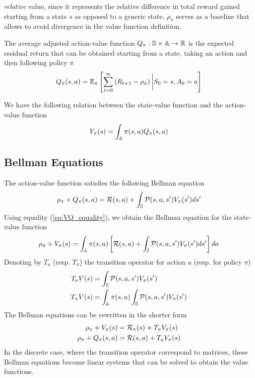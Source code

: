 \emph{relative} value, since it represents the relative difference in total
reward gained starting from a state $s$ as opposed to a generic state. 
$\rho_\pi$ serves as a baseline that allows to avoid divergence in the value
function definition.
\begin{definition}
	The average adjusted action-value function $Q_\pi : \S \times \A \to \R$ is 
	the expected residual return that can be obtained starting from a state,
	taking an action and then following policy $\pi$
	\begin{equation}
		Q_\pi(s, a) = \E[\pi]{\sum^{\infty}_{t=0} \left(R_{t+1} -
			\rho_\pi\right) \bigg| S_0 = s, A_0
		= a}
	\end{equation}
\end{definition}
We have the following relation between the state-value function and the
action-value function
\begin{equation}\label{eq:VQ_equality}
	V_\pi(s) = \int_\A \pi(s,a) Q_\pi(s,a)
\end{equation}

\subsection{Bellman Equations}
The action-value function satisfies the following Bellman equation 
\begin{equation}
	\rho_\pi + Q_\pi(s,a) = \calR(s,a) + \int_\S \calP(s,a,s') V_\pi(s') ds'
\end{equation}
Using equality (\ref{eq:VQ_equality}), we obtain the Bellman equation for the
state-value function
\begin{equation}
	\rho_\pi + V_\pi(s) = \int_\A \pi(s,a) \left[\calR(s,a) + \int_\S 
	\calP(s,a,s') V_\pi(s') ds'\right] da
\end{equation}
Denoting by $T_a$ (resp. $T_\pi$) the transition operator for action $a$ (resp. 
for policy $\pi$)
\begin{equation}
	\begin{split}
		T_a V(s) &= \int_\S \calP(s, a, s') V_\pi(s')\\
		T_\pi V(s) &= \int_\A \pi(s,a) \int_\S \calP(s,a,s') V_\pi(s')\\ 
	\end{split}
\end{equation}
The Bellman equations can be rewritten in the shorter form
\begin{equation}
	\begin{split}
		\rho_\pi + V_\pi(s) &= \calR_\pi(s) + T_\pi V_\pi(s)\\
		\rho_\pi + Q_\pi(s,a) &= \calR(s,a) + T_a V_\pi(s)\\
	\end{split}
\end{equation}
In the discrete case, where the transition operator correspond to matrices, 
these Bellman equations become linear systems that can be solved to obtain the
value functions. 

